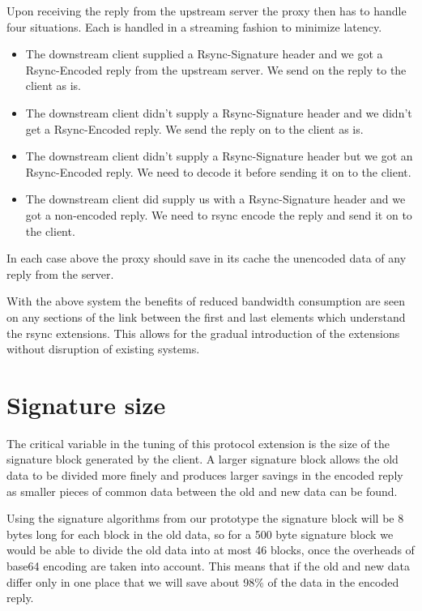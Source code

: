 \documentclass[a4paper]{article}
\begin{document}
Upon receiving the reply from the upstream server the proxy then has
to handle four situations. Each is handled in a streaming fashion to
minimize latency.

\begin{itemize}
\item
  The downstream client supplied a Rsync-Signature header and we got a
  Rsync-Encoded reply from the upstream server. We send on the reply
  to the client as is.
  
\item The downstream client didn't supply a Rsync-Signature header and
  we didn't get a Rsync-Encoded reply. We send the reply on to the
  client as is.
  
\item The downstream client didn't supply a Rsync-Signature header but
  we got an Rsync-Encoded reply. We need to decode it before sending
  it on to the client.
  
\item The downstream client did supply us with a Rsync-Signature
  header and we got a non-encoded reply. We need to rsync encode the
  reply and send it on to the client.
\end{itemize}

In each case above the proxy should save in its cache the unencoded
data of any reply from the server.

With the above system the benefits of reduced bandwidth consumption
are seen on any sections of the link between the first and last
elements which understand the rsync extensions. This allows for the
gradual introduction of the extensions without disruption of existing
systems. 

\section*{Signature size}

The critical variable in the tuning of this protocol extension is the
size of the signature block generated by the client. A larger
signature block allows the old data to be divided more finely and
produces larger savings in the encoded reply as smaller pieces of
common data between the old and new data can be found. 

Using the signature algorithms from our prototype the signature block
will be 8 bytes long for each block in the old data, so for a 500 byte
signature block we would be able to divide the old data into at most
46 blocks, once the overheads of base64 encoding are taken into
account. This means that if the old and new data differ only in one
place that we will save about 98\% of the data in the encoded reply.
\end{document}
